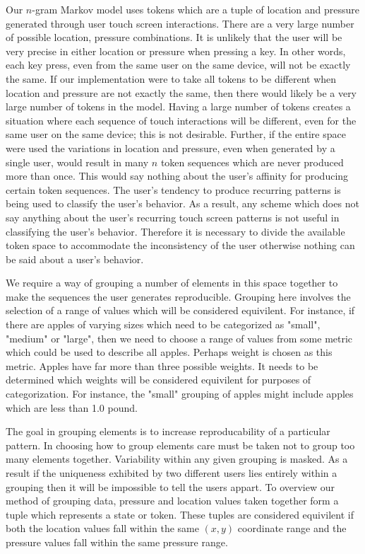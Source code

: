 Our $n$-gram Markov model uses tokens
which are a tuple of location and pressure
generated through user touch screen interactions. 
There are a very large number of possible
location, pressure combinations.
%
It is unlikely that the user will be
very precise in either location or pressure
when pressing a key.
In other words,
each key press, 
even from the same user on the same device,
will not be exactly the same.
%
If our implementation were to take all tokens to be different when
location and pressure are not exactly the same,
then there would likely be a very large number of tokens in the model.
%
Having a large number of tokens
creates a situation where each sequence of 
touch interactions will be different,
even for the same user on the same device;
this is not desirable.
%
Further, if the entire space were used 
the variations in location and pressure,
even when generated by a single user,
would result in many $n$ token sequences
which are never produced more than once.
%
This would say nothing about
the user's affinity for producing certain token sequences.
The user's tendency to produce recurring patterns
is being used to classify the user's behavior.
%
As a result,
any scheme which does not say anything about the
user's recurring touch screen patterns is not useful
in classifying the user's behavior.
%
Therefore it is necessary to divide the available token space
to accommodate the inconsistency of the user
otherwise
nothing can be said about a user's behavior.

We require a way of grouping a number of elements in this space together
to make the sequences the user generates reproducible.
%
Grouping here involves the selection of
a range of values which will be considered equivilent.
%
For instance, 
if there are apples of varying sizes
which need to be categorized as "small", "medium" or "large",
then we need to choose a range of values from some metric 
which could be used to describe all apples.
Perhaps weight is chosen as this metric.
Apples have far more than three possible weights.
It needs to be determined which weights will be considered equivilent for
purposes of categorization.
%
For instance, the "small" grouping of apples might include
apples which are less than 1.0 pound.

The goal in grouping elements is to
increase reproducability of a particular pattern.
%
In choosing how to group elements
care must be taken not to group too many 
elements together.
Variability within any given grouping 
is masked.
As a result if 
the uniqueness exhibited by 
two different users lies entirely within
a grouping
then 
it will be impossible to tell the users appart.
%
To overview our method of grouping data,
pressure and location values taken together form a tuple
which represents a state or token.
These tuples are considered equivilent 
if both
the location values fall within the same $(x,y)$ coordinate range and
the pressure values fall within the same pressure range.

